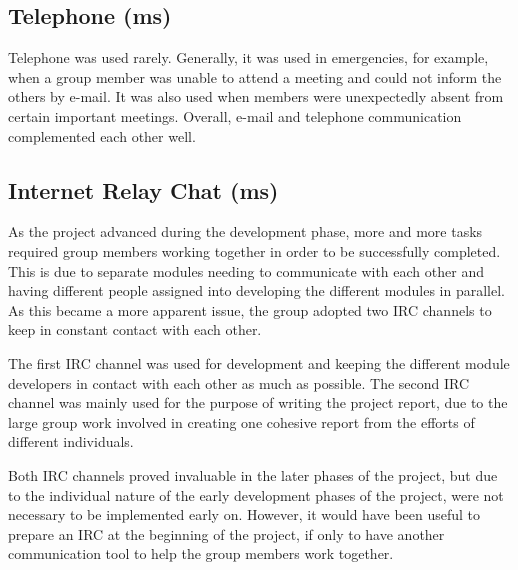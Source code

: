 \subsection{Telephone (ms)}

Telephone was used rarely. Generally, it was used in 
emergencies, for example, 
when a group member was unable to attend a meeting
and could not inform the others by e-mail. It was also
used when members were unexpectedly absent from 
certain important meetings. Overall, e-mail and 
telephone communication complemented each other well.

\subsection{Internet Relay Chat (ms)}

As the project advanced during the development phase,
more and more tasks required group members working together
in order to be successfully completed. This is due to 
separate modules needing to communicate with each other
and having different people assigned into developing the different modules
in parallel. As this became a more apparent issue, the group adopted
two IRC channels to keep in constant contact with each other.

The first IRC channel was used for development and keeping the 
different module developers in contact with each other as much as possible. 
The second IRC channel was mainly used for the purpose of writing the project
report, due to the large group work involved in creating one cohesive report
from the efforts of different individuals.

Both IRC channels proved invaluable in the later phases of the project, but
due to the individual nature of the early development phases of the project,
were not necessary to be implemented early on. However, it would have been
useful to prepare an IRC at the beginning of the project, if only to have 
another communication tool to help the group members work together.
